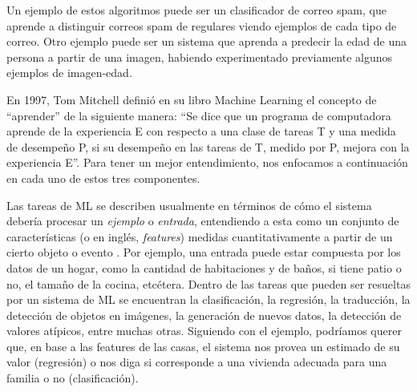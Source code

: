 \documentclass[../../main.tex]{subfiles}
\begin{document}
Un ejemplo de estos algoritmos puede ser un clasificador de correo spam, que aprende a
distinguir correos spam de regulares viendo ejemplos de cada tipo de correo. Otro ejemplo
puede ser un sistema que aprenda a predecir la edad de una persona a partir de una imagen,
habiendo experimentado previamente algunos ejemplos de imagen-edad.

En 1997, Tom Mitchell definió en su libro Machine Learning \cite{ml-tom-mitchell} el
concepto de ``aprender'' de la siguiente manera: ``Se dice que un programa de computadora
aprende de la experiencia E con respecto a una clase de tareas T y una medida de desempeño
P, si su desempeño en las tareas de T, medido por P, mejora con la experiencia E''. Para
tener un mejor entendimiento, nos enfocamos a continuación en cada uno de estos tres
componentes.

Las tareas de ML se describen usualmente en términos de cómo el sistema debería procesar
un \textit{ejemplo} o \textit{entrada}, entendiendo a esta como un conjunto de
características (o en inglés, \textit{features}) medidas cuantitativamente a partir de un
cierto objeto o evento \cite{deep-learning}. Por ejemplo, una entrada puede estar
compuesta por los datos de un hogar, como la cantidad de habitaciones y de baños, si tiene
patio o no, el tamaño de la cocina, etcétera. Dentro de las tareas que pueden ser
resueltas por un sistema de ML se encuentran la clasificación, la regresión, la
traducción, la detección de objetos en imágenes, la generación de nuevos datos, la
detección de valores atípicos, entre muchas otras. Siguiendo con el ejemplo, podríamos
querer que, en base a las features de las casas, el sistema nos provea un estimado
de su valor (regresión) o nos diga si corresponde a una vivienda adecuada para una
familia o no (clasificación).
\end{document}
